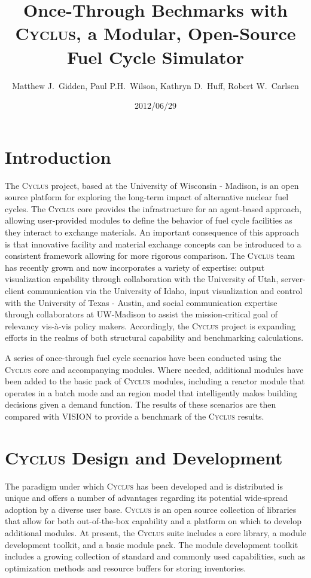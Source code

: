 \documentclass{anstrans}
\title{Once-Through Bechmarks with \textsc{Cyclus}, a Modular, Open-Source Fuel Cycle Simulator}
\author{Matthew J.~Gidden, Paul P.H.~Wilson, Kathryn D.~Huff, Robert W.~Carlsen}
\institute{Department of Nuclear Engineering \& Engineering Physics, University of Wisconsin - Madison, Madison, WI, 53703}
\date{2012/06/29}
\begin{document}
\section{Introduction}
The \textsc{Cyclus} project, based at the University of Wisconsin -
Madison, is an open source platform for exploring the long-term impact
of alternative nuclear fuel cycles.  The \textsc{Cyclus} core provides
the infrastructure for an agent-based approach, allowing user-provided
modules to define the behavior of fuel cycle facilities as they
interact to exchange materials.  An important consequence of this
approach is that innovative facility and material exchange concepts
can be introduced to a consistent framework allowing for more rigorous
comparison.  The \textsc{Cyclus} team has recently grown and now
incorporates a variety of expertise: output visualization capability
through collaboration with the University of Utah, server-client
communication via the University of Idaho, input visualization and
control with the University of Texas - Austin, and social
communication expertise through collaborators at UW-Madison to assist
the mission-critical goal of relevancy vis-\`{a}-vis policy
makers. Accordingly, the \textsc{Cyclus} project is expanding efforts in
the realms of both structural capability and benchmarking
calculations.

A series of once-through fuel cycle scenarios have been conducted
using the \textsc{Cyclus} core and accompanying modules. Where needed,
additional modules have been added to the basic pack of \textsc{Cyclus}
modules, including a reactor module that operates in a batch mode and
an region model that intelligently makes building decisions given a
demand function. The results of these scenarios are then compared with
VISION \cite{vision2009} to provide a benchmark of the \textsc{Cyclus}
results.

\section{\textsc{Cyclus} Design and Development}
The paradigm under which \textsc{Cyclus} has been developed and is
distributed is unique and offers a number of advantages regarding its
potential wide-spread adoption by a diverse user base. \textsc{Cyclus}
is an open source collection of libraries that allow for both
out-of-the-box capability and a platform on which to develop
additional modules. At present, the \textsc{Cyclus} suite includes a
core library, a module development toolkit, and a basic module pack.
The module development toolkit includes a growing collection of
standard and commonly used capabilities, such as optimization methods
and resource buffers for storing inventories.
\end{document}

